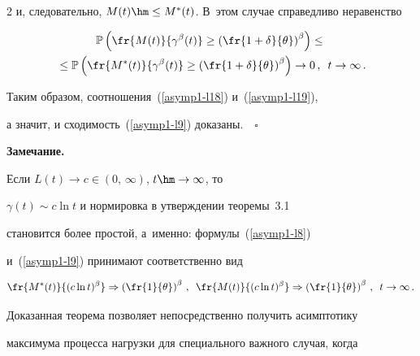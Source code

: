\begin{multicols}{2}
и, следовательно, $M(t)\hm \leq M^*(t)$. В~этом случае справедливо неравенство


\begin{multline*}


\mathbb{P}\left( \fr{M(t)}{\gamma^\beta(t)}\geq


\left(\fr{1+\delta}{\theta}\right)^\beta\right) \leq{}\\


{}\leq \mathbb{P}\left(


\fr{M^*(t)}{\gamma^\beta(t)}\geq


\left(\fr{1+\delta}{\theta}\right)^\beta\right) \to 0\,,\enskip  t\to \infty\,.


\end{multline*}


Таким образом, соотношения~(\ref{asymp1-l18}) и~(\ref{asymp1-l19}),


а значит, и сходимость~(\ref{asymp1-l9})  доказаны.~\hfill~$\square$





\medskip








\noindent


\textbf{Замечание.}


Если $L(t) \to c\in (0,\,\infty)$, $t \hm\to \infty$,  то


$\gamma(t)\sim c \ln t$ и нормировка в утверждении теоремы~3.1


становится более простой, а~именно: формулы~(\ref{asymp1-l8})


и~(\ref{asymp1-l9}) принимают соответственно вид


$$


\fr{M^*(t)}{(c\ln t)^\beta} \Rightarrow


\left(\fr{1}{\theta}\right)^\beta\,,\enskip \fr{M(t)}{(c\ln


t)^\beta} \Rightarrow


\left(\fr{1}{\theta}\right)^\beta\,,\enskip t \to \infty\,.


$$





\smallskip





Доказанная теорема позволяет непосредственно  получить асимптотику


максимума процесса нагрузки для специального важного случая, когда



\end{multicols}
